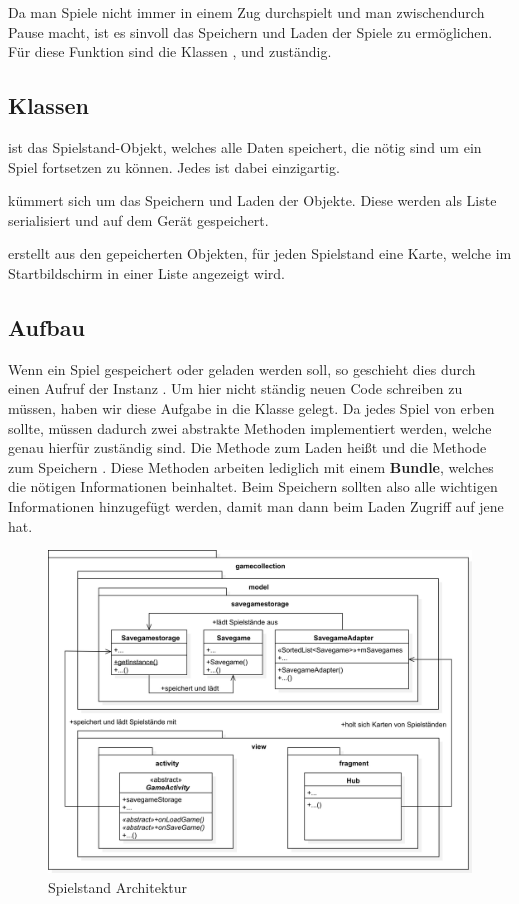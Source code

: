 Da man Spiele nicht immer in einem Zug durchspielt und man zwischendurch Pause
macht, ist es sinvoll das Speichern und Laden der Spiele zu ermöglichen. Für
diese Funktion sind die Klassen ,  und
 zuständig.

\subsection{Klassen}

 ist das Spielstand-Objekt, welches alle Daten speichert, die
nötig sind um ein Spiel fortsetzen zu können. Jedes  ist dabei
einzigartig.

 kümmert sich um das Speichern und Laden der
 Objekte. Diese werden als Liste serialisiert und auf dem Gerät
gespeichert.

 erstellt aus den gepeicherten  Objekten,
für jeden Spielstand eine Karte, welche im Startbildschirm in einer Liste
angezeigt wird.

\subsection{Aufbau}

Wenn ein Spiel gespeichert oder geladen werden soll, so geschieht dies durch
einen Aufruf der Instanz . Um hier nicht ständig neuen
Code schreiben zu müssen, haben wir diese Aufgabe in die Klasse
 gelegt. Da jedes Spiel von  erben sollte,
müssen dadurch zwei abstrakte Methoden implementiert werden, welche genau
hierfür zuständig sind. Die Methode zum Laden heißt  und die
Methode zum Speichern . Diese Methoden arbeiten lediglich mit
einem \textbf{Bundle}, welches die nötigen Informationen beinhaltet. Beim
Speichern sollten also alle wichtigen Informationen hinzugefügt werden, damit
man dann beim Laden Zugriff auf jene hat.

\begin{figure}[h]
	\centering
	\includegraphics[width=1.0\textwidth]{resources/savegamestorage/Savegamestorage}
	\caption{Spielstand Architektur}
\end{figure}
